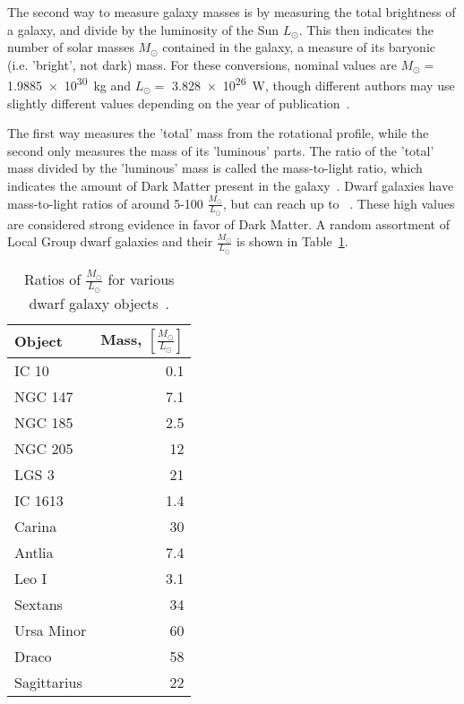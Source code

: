     The second way to measure galaxy masses is by measuring the total brightness of a galaxy, and divide by the luminosity of the Sun $L_\odot$.
    This then indicates the number of solar masses $M_\odot$ contained in the galaxy, a measure of its baryonic (i.e. 'bright', not dark) mass.
    For these conversions, nominal values are $M_\odot =$ \SI{1.9885e30}{kg} and $L_\odot =$ \SI{3.828e26}{W}, though different authors may use slightly different values depending on the year of publication~\cite{iau_solarconstants}.
    
    The first way measures the 'total' mass from the rotational profile, while the second only measures the mass of its 'luminous' parts.
    The ratio of the 'total' mass divided by the 'luminous' mass is called the mass-to-light ratio, which indicates the amount of Dark Matter present in the galaxy~\cite{faber_ml}.
    Dwarf galaxies have mass-to-light ratios of around 5-100 $\frac{M_\odot}{L_\odot}$, but can reach up to ~\cite{Simon2007_dwarfgalaxykeck}.
    These high values are considered strong evidence in favor of Dark Matter.
    A random assortment of Local Group dwarf galaxies and their $\frac{M_\odot}{L_\odot}$ is shown in Table~\ref{tab:mlratios:dwarfgals}.
    
    \begin{table}[]
      \centering
      \caption[Ratios of $\frac{M_\odot}{L_\odot}$ for Various Dwarf Galaxy Objects]{Ratios of $\frac{M_\odot}{L_\odot}$ for various dwarf galaxy objects~\cite{localdwarfs}.}
      \label{tab:mlratios:dwarfgals}
      \begin{tabular}{l r}
        Object      &  Mass, $\left [ \frac{M_\odot}{L_\odot} \right ]$ \\
        \hline
        IC 10       &  0.1 \\
        NGC 147     &  7.1 \\
        NGC 185     &  2.5 \\
        NGC 205     & 12   \\
        LGS 3       & 21   \\
        IC 1613     &  1.4 \\
        Carina      & 30   \\
        Antlia      &  7.4 \\
        Leo I       &  3.1 \\
        Sextans     & 34   \\
        Ursa Minor  & 60   \\
        Draco       & 58   \\
        Sagittarius & 22   \\
      \end{tabular}
    \end{table}
    
